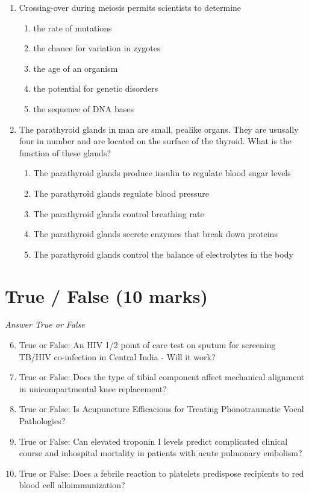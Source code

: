 \documentclass[12pt]{article}
\begin{document}
\begin{enumerate}[label=\arabic*.]
\begin{enumerate}[label=(\alph*)]
\end{enumerate}
\item Crossing-over during meiosis permits scientists to determine
\begin{enumerate}[label=(\alph*)]
    \item the rate of mutations
    \item the chance for variation in zygotes
    \item the age of an organism
    \item the potential for genetic disorders
    \item the sequence of DNA bases
\end{enumerate}
\item The parathyroid glands in man are small, pealike organs. They are ususally four in number and are located on the surface of the thyroid. What is the function of these glands?
\begin{enumerate}[label=(\alph*)]
    \item The parathyroid glands produce insulin to regulate blood sugar levels
    \item The parathyroid glands regulate blood pressure
    \item The parathyroid glands control breathing rate
    \item The parathyroid glands secrete enzymes that break down proteins
    \item The parathyroid glands control the balance of electrolytes in the body
\end{enumerate}
\end{enumerate}

\section*{True / False (10 marks)}
\textit{Answer True or False}
\begin{enumerate}[label=\arabic*.]
\setcounter{enumi}{5}
\item True or False: An HIV 1/2 point of care test on sputum for screening TB/HIV co-infection in Central India - Will it work?
\item True or False: Does the type of tibial component affect mechanical alignment in unicompartmental knee replacement?
\item True or False: Is Acupuncture Efficacious for Treating Phonotraumatic Vocal Pathologies?
\item True or False: Can elevated troponin I levels predict complicated clinical course and inhospital mortality in patients with acute pulmonary embolism?
\item True or False: Does a febrile reaction to platelets predispose recipients to red blood cell alloimmunization?
\end{enumerate}
\end{document}
